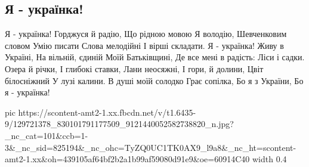  
 
 
 
 

\subsection{Я - українка!}

Я - українка!
Горджуся й радію,
Що рідною мовою
Я володію,
Шевченковим словом
Умію писати
Слова мелодійні
І вірші складати.
Я - українка!
Живу в Україні,
На вільній, єдиній
Моїй Батьківщині,
Де все мені в радість:
Ліси і садки.
Озера й річки,
І глибокі ставки,
Лани неосяжні,
І гори, й долини,
Цвіт білосніжний
У лузі калини.
В душі моїй солодко
Грає сопілка,
Бо я з України,
Бо я - українка!


\ifcmt
  pic https://scontent-amt2-1.xx.fbcdn.net/v/t1.6435-9/129721378_830101791177509_9121440052582738820_n.jpg?_nc_cat=101&ccb=1-3&_nc_sid=825194&_nc_ohc=TyZQ0UC1TK0AX9_l9a8&_nc_ht=scontent-amt2-1.xx&oh=439105af64bf2b2a1b99af59080d91e9&oe=60914C40
  width 0.4
\fi

